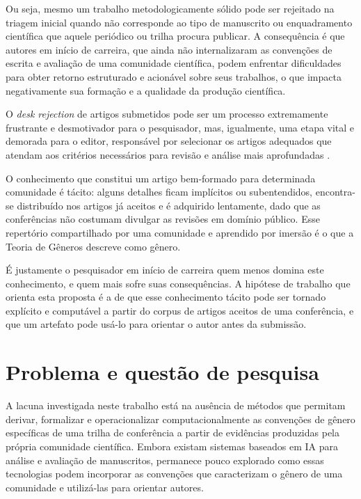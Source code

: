 Ou seja, mesmo um trabalho metodologicamente sólido pode ser rejeitado na triagem inicial quando não corresponde ao tipo de manuscrito ou enquadramento científica que aquele periódico ou trilha procura publicar. A consequência é que autores em início de carreira, que ainda não internalizaram as convenções de escrita e avaliação de uma comunidade científica, podem enfrentar dificuldades para obter retorno estruturado e acionável sobre seus trabalhos, o que impacta negativamente sua formação e a qualidade da produção científica.

O \textit{desk rejection} de artigos submetidos pode ser um processo extremamente frustrante e desmotivador para o pesquisador, mas, igualmente, uma etapa vital e demorada para o editor, responsável por selecionar os artigos adequados que atendam aos critérios necessários para revisão e análise mais aprofundadas \cite{Dwivedi2022}.

O conhecimento que constitui um artigo bem-formado para determinada comunidade é tácito: alguns detalhes ficam implícitos ou subentendidos, encontra-se distribuído nos artigos já aceitos e é adquirido lentamente, dado que as conferências não costumam divulgar as revisões em domínio público. Esse repertório compartilhado por uma comunidade e aprendido por imersão é o que a Teoria de Gêneros \cite{GenresOrgComm} descreve como gênero.

É justamente o pesquisador em início de carreira quem menos domina este conhecimento, e quem mais sofre suas consequências. A hipótese de trabalho que orienta esta proposta é a de que esse conhecimento tácito pode ser tornado explícito e computável a partir do corpus de artigos aceitos de uma conferência, e que um artefato pode usá-lo para orientar o autor antes da submissão.

\section{Problema e questão de pesquisa}

A lacuna investigada neste trabalho está na ausência de métodos que permitam derivar, formalizar e operacionalizar computacionalmente as convenções de gênero específicas de uma trilha de conferência a partir de evidências produzidas pela própria comunidade científica. Embora existam sistemas baseados em IA para análise e avaliação de manuscritos, permanece pouco explorado como essas tecnologias podem incorporar as convenções que caracterizam o gênero de uma comunidade e utilizá-las para orientar autores.

